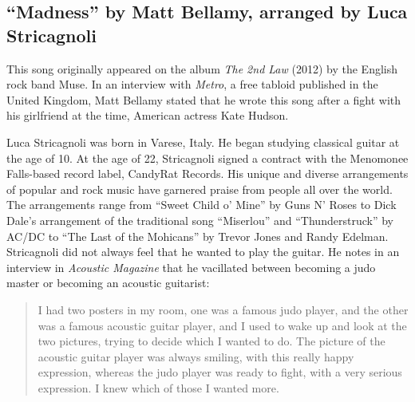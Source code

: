 \documentclass{tufte-handout}
\newcommand{\textls}[2][5]{%
    \begingroup\addfontfeatures{LetterSpace=#1}#2\endgroup
  }
\renewcommand{\smallcapsspacing}[1]{\textls[10]{#1}}
\renewcommand{\textsc}[1]{\smallcapsspacing{\textsmallcaps{#1}}}
\begin{document}


\subsection*{``Madness'' by Matt Bellamy, arranged by Luca Stricagnoli}
This song originally appeared on the album \emph{The 2nd Law} (2012) by the English
rock band Muse. In an interview with \emph{Metro}, a free tabloid published in
the United Kingdom, Matt Bellamy stated that he wrote this song after a fight
with his girlfriend at the time, American actress Kate Hudson.

Luca Stricagnoli was born in Varese, Italy. He began studying classical guitar
at the age of 10. At the age of 22, Stricagnoli signed a contract with the
Menomonee Falls-based record label, CandyRat Records. His unique and diverse
arrangements of popular and rock music have garnered praise from people all
over the world. The arrangements range from ``Sweet Child o' Mine'' by Guns N'
Roses to Dick Dale's arrangement of the traditional song ``Miserlou'' and
``Thunderstruck'' by AC/DC to ``The Last of the Mohicans'' by Trevor Jones and
Randy Edelman. Stricagnoli did not always feel that he wanted to play the
guitar. He notes in an interview in \emph{Acoustic Magazine} that he
vacillated between becoming a judo master or becoming an acoustic guitarist:
\begin{quote}
  I had two posters in my room, one was a famous judo player, and the other
  was a famous acoustic guitar player, and I used to wake up and look at the
  two pictures, trying to decide which I wanted to do. The picture of the
  acoustic guitar player was always smiling, with this really happy
  expression, whereas the judo player was ready to fight, with a very serious
  expression. I knew which of those I wanted more.
\end{quote}
\end{document}
